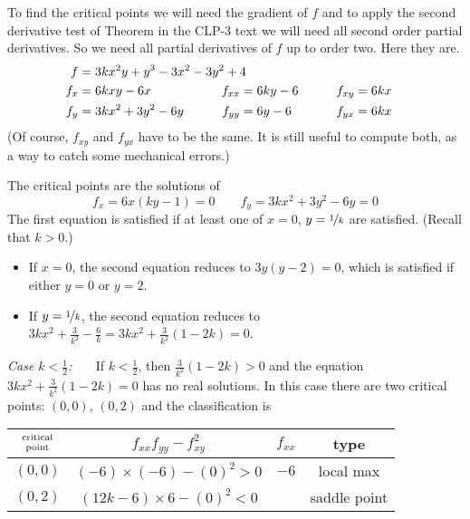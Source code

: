 \begin{solution}
To find the critical points we will need the
gradient of $f$ and to apply the second derivative test of 
Theorem  in the CLP-3 text 
we will need all 
second order partial derivatives. So we need all partial derivatives of
$f$ up to order two.
Here they are.
\begin{alignat*}{3}
f&=3kx^2 y + y^3 - 3x^2 - 3y^2 + 4 \hidewidth\\
f_x&=6kxy-6x   & f_{xx}&=6ky-6 \qquad & f_{xy}&= 6kx\\
f_y&=3kx^2+3y^2-6y \qquad & f_{yy}&=6y-6\qquad & f_{yx}&= 6kx
\end{alignat*}
(Of course, $f_{xy}$ and $f_{yx}$ have to be the same. It is still
useful to compute both, as a way to catch some mechanical errors.)

The critical points are the solutions of
\begin{equation*}
f_x=6x(ky-1)=0   \qquad
f_y=3kx^2+3y^2-6y = 0
\end{equation*}
The first equation is satisfied if at least one of $x=0$, $y=\nicefrac{1}{k}$
are satisfied. (Recall that $k>0$.)
\begin{itemize}
\item 
If $x=0$, the second equation reduces to $3y(y-2)=0$, which is
satisfied if either $y=0$ or $y=2$.
\item 
If $y=\nicefrac{1}{k}$, the second equation reduces to 
$3kx^2+\frac{3}{k^2}-\frac{6}{k}=3kx^2+\frac{3}{k^2}(1-2k)=0$.
\end{itemize}

\emph{Case $k<\frac{1}{2}$:\ \ \ }
If $k<\frac{1}{2}$, then $\frac{3}{k^2}(1-2k)>0$ and the equation 
$3kx^2+\frac{3}{k^2}(1-2k)=0$ has no real solutions. In this case 
there are two critical points: $(0,0)$, $(0,2)$ and the classification is
\begin{center}
\renewcommand{\arraystretch}{1.3}
     \begin{tabular}{|c|c|c|c|}
     \hline
    $\Atop{\text{critical}}{\text{point}}$  & $f_{xx}f_{yy}-f_{xy}^2$ & 
                                                          $f_{xx}$ & type \\    
    \hline
     $(0,0)$  & $(-6)\times(-6)-(0)^2> 0$ & $-6$   & local max  \\ \hline
     $(0,2)$  & $(12k-6)\times 6-(0)^2<0$ &   & saddle point \\  \hline
     \end{tabular}
\renewcommand{\arraystretch}{1.0}
\end{center}



\end{solution}

